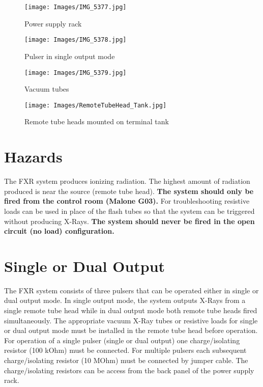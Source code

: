 \documentclass[11pt, twoside, a4paper]{article}
\begin{document}
\begin{figure}[h]
    \begin{minipage}[t]{0.48\textwidth}
        \centering
        \texttt{[image: Images/IMG\_5377.jpg]}
        \caption{Power supply rack}
        \label{fig:rack}
    \end{minipage}
    \hfill
    \begin{minipage}[t]{0.48\textwidth}
        \centering
        \texttt{[image: Images/IMG\_5378.jpg]}
        \caption{Pulser in single output mode}
        \label{fig:pulser}
    \end{minipage}

    \vspace{1cm} %
    
    \begin{minipage}[t]{0.48\textwidth}
        \centering
        \texttt{[image: Images/IMG\_5379.jpg]}
        \caption{Vacuum tubes}
        \label{fig:tubes}
    \end{minipage}
    \hfill
    \begin{minipage}[t]{0.48\textwidth}
        \centering
        \texttt{[image: Images/RemoteTubeHead\_Tank.jpg]}
        \caption{Remote tube heads mounted on terminal tank}
        \label{fig:RT_on_tank}
    \end{minipage}
\end{figure}

\section{Hazards} 
The FXR system produces ionizing radiation. The highest amount of radiation produced is near the source (remote tube head). \textbf{The system should only be fired from the control room (Malone G03).} For troubleshooting resistive loads can be used in place of the flash tubes so that the system can be triggered without producing X-Rays. \textbf{The system should never be fired in the open circuit (no load) configuration.}

\section{Single or Dual Output}
The FXR system consists of three pulsers that can be operated either in single or dual output mode. In single output mode, the system outputs X-Rays from
a single remote tube head while in dual output mode both remote tube heads fired simultaneously. The appropriate vacuum X-Ray tubes or resistive loads for single or dual output mode must be installed in the remote tube head before operation. For operation of a single pulser (single or dual output) one charge/isolating resistor (100 kOhm) must be connected. For multiple pulsers each subsequent charge/isolating resistor (10 MOhm) must be connected by jumper cable. The charge/isolating resistors can be access from the back panel of the power supply rack.
\end{document}
